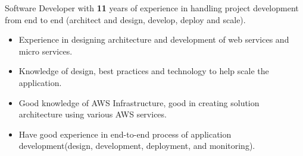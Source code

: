 %
%
%
\par{
Software Developer with \textbf{11} years of experience in handling project development from end to end (architect and design, develop, deploy and scale).
}
 \begin{itemize}
    \item Experience in designing architecture and development of web services and micro services. 
    \item Knowledge of design, best practices and technology to help scale the application.
    \item Good knowledge of AWS Infrastructure, good in creating solution architecture using various AWS services.             
    \item Have good experience in end-to-end process of application development(design, development, deployment, and monitoring).
\end{itemize}
